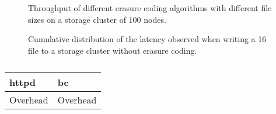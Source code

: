 \begin{figure*}
    \centering
    
    \caption{Throughput of different erasure coding algorithms with different file sizes on a storage cluster of 100 nodes.}
    \label{fig:throughput-plot}
\end{figure*}

\begin{figure}
    \centering
    
    \caption{Cumulative distribution of the latency observed when writing a \SI{16}{\mebi\byte} file to a storage cluster without erasure coding.}
    \label{fig:latency-plot}
\end{figure}

\begin{table}
    \centering
    \begin{tabular}{ll}
        \toprule
        httpd & bc \\
        \midrule
        Overhead & Overhead \\
        \bottomrule
    \end{tabular}
    \caption{}
    \label{fig:overhead-table}
\end{table}

\begin{figure*}
    \centering
    \caption{}
    \label{fig:trace-experiment-plot}
\end{figure*}
